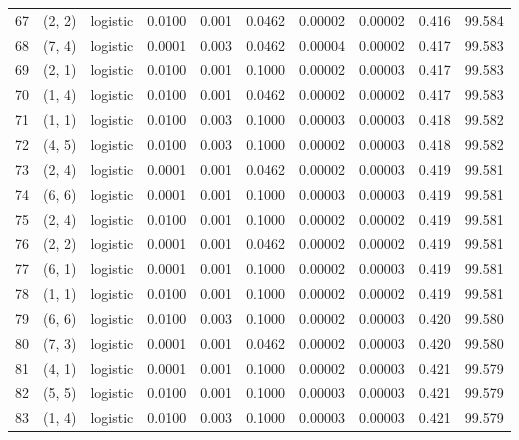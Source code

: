 \begin{tabular}{lllrrrrrrr}
67  &      (2, 2) &  logistic &  0.0100 &  0.001 &  0.0462 &          0.00002 &    0.00002 &       0.416 &    99.584 \\
68  &      (7, 4) &  logistic &  0.0001 &  0.003 &  0.0462 &          0.00004 &    0.00002 &       0.417 &    99.583 \\
69  &      (2, 1) &  logistic &  0.0100 &  0.001 &  0.1000 &          0.00002 &    0.00003 &       0.417 &    99.583 \\
70  &      (1, 4) &  logistic &  0.0100 &  0.001 &  0.0462 &          0.00002 &    0.00002 &       0.417 &    99.583 \\
71  &      (1, 1) &  logistic &  0.0100 &  0.003 &  0.1000 &          0.00003 &    0.00003 &       0.418 &    99.582 \\
72  &      (4, 5) &  logistic &  0.0100 &  0.003 &  0.1000 &          0.00002 &    0.00003 &       0.418 &    99.582 \\
73  &      (2, 4) &  logistic &  0.0001 &  0.001 &  0.0462 &          0.00002 &    0.00003 &       0.419 &    99.581 \\
74  &      (6, 6) &  logistic &  0.0001 &  0.001 &  0.1000 &          0.00003 &    0.00003 &       0.419 &    99.581 \\
75  &      (2, 4) &  logistic &  0.0100 &  0.001 &  0.1000 &          0.00002 &    0.00002 &       0.419 &    99.581 \\
76  &      (2, 2) &  logistic &  0.0001 &  0.001 &  0.0462 &          0.00002 &    0.00002 &       0.419 &    99.581 \\
77  &      (6, 1) &  logistic &  0.0001 &  0.001 &  0.1000 &          0.00002 &    0.00003 &       0.419 &    99.581 \\
78  &      (1, 1) &  logistic &  0.0100 &  0.001 &  0.1000 &          0.00002 &    0.00002 &       0.419 &    99.581 \\
79  &      (6, 6) &  logistic &  0.0100 &  0.003 &  0.1000 &          0.00002 &    0.00003 &       0.420 &    99.580 \\
80  &      (7, 3) &  logistic &  0.0001 &  0.001 &  0.0462 &          0.00002 &    0.00003 &       0.420 &    99.580 \\
81  &      (4, 1) &  logistic &  0.0001 &  0.001 &  0.1000 &          0.00002 &    0.00003 &       0.421 &    99.579 \\
82  &      (5, 5) &  logistic &  0.0100 &  0.001 &  0.1000 &          0.00003 &    0.00003 &       0.421 &    99.579 \\
83  &      (1, 4) &  logistic &  0.0100 &  0.003 &  0.1000 &          0.00003 &    0.00003 &       0.421 &    99.579 \\

\end{tabular}
